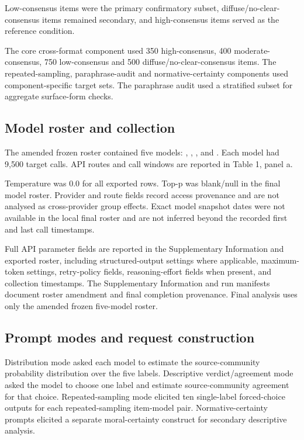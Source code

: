 \documentclass[11pt]{article}
\begin{document}
Low-consensus items were the primary confirmatory subset, diffuse/no-clear-consensus items remained secondary, and high-consensus items served as the reference condition.

The core cross-format component used 350 high-consensus, 400 moderate-consensus, 750 low-consensus and 500 diffuse/no-clear-consensus items. The repeated-sampling, paraphrase-audit and normative-certainty components used component-specific target sets. The paraphrase audit used a stratified subset for aggregate surface-form checks.

\subsection{Model roster and collection}

The amended frozen roster contained five models: , , ,  and . Each model had 9,500 target calls. API routes and call windows are reported in Table 1, panel a.

Temperature was 0.0 for all exported rows. Top-p was blank/null in the final model roster. Provider and route fields record access provenance and are not analysed as cross-provider group effects. Exact model snapshot dates were not available in the local final roster and are not inferred beyond the recorded first and last call timestamps.

Full API parameter fields are reported in the Supplementary Information and exported roster, including structured-output settings where applicable, maximum-token settings, retry-policy fields, reasoning-effort fields when present, and collection timestamps. The Supplementary Information and run manifests document roster amendment and final completion provenance. Final analysis uses only the amended frozen five-model roster.

\subsection{Prompt modes and request construction}

Distribution mode asked each model to estimate the source-community probability distribution over the five labels. Descriptive verdict/agreement mode asked the model to choose one label and estimate source-community agreement for that choice. Repeated-sampling mode elicited ten single-label forced-choice outputs for each repeated-sampling item-model pair. Normative-certainty prompts elicited a separate moral-certainty construct for secondary descriptive analysis.
\end{document}
